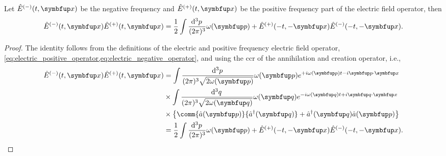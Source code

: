 \begin{lemma}\label{th:electric_operator_mixed_frequency}
	Let $\hat{E}^{(-)}(t,\vb{x})$ be the negative frequency and $\hat{E}^{(+)}(t,\vb{x})$ be the positive frequency part of the electric field operator, then
	\begin{equation}
		\hat{E}^{(-)}(t,\vb{x})
		\hat{E}^{(+)}(t,\vb{x})
		=
		\frac{1}{2}
		\int\frac{\dd[3]{p}}{(2\pi)^3}
		\omega(\vb{p})
		+
		\hat{E}^{(+)}(-t,-\vb{x})
		\hat{E}^{(-)}(-t,-\vb{x})
		.
	\end{equation}
\end{lemma}
\begin{proof}
	The identity follows from the definitions of the electric and positive frequency electric field operator, \cref{eq:electric_positive_operator,eq:electric_negative_operator},
	and using the \gls{ccr} of the annihilation and creation operator, i.e.,
	\begin{equation}
		\begin{split}
			\hat{E}^{(-)}(t,\vb{x})
			\hat{E}^{(+)}(t,\vb{x})
			&=
			\int\frac{\dd[3]{p}}{(2\pi)^3\sqrt{2\omega(\vb{p})}}
			\omega(\vb{p})
			e^{+i\omega(\vb{p})t-i\vb{p}\vdot\vb{x}}
			\\
			&\times
			\int\frac{\dd[3]{q}}{(2\pi)^3\sqrt{2\omega(\vb{q})}}
			\omega(\vb{q})
			e^{-i\omega(\vb{q})t+i\vb{q}\vdot\vb{x}}
			\\
			&\times
			\left\{
				\comm{\hat{a}(\vb{p})}{\hat{a}^\dagger(\vb{q})}
				+
				\hat{a}^\dagger(\vb{q})
				\hat{a}(\vb{p})
			\right\}
			\\
			&=
			\frac{1}{2}
			\int\frac{\dd[3]{p}}{(2\pi)^3}
			\omega(\vb{p})
			+
			\hat{E}^{(+)}(-t,-\vb{x})
			\hat{E}^{(-)}(-t,-\vb{x})
			.
		\end{split}
	\end{equation}
\end{proof}


